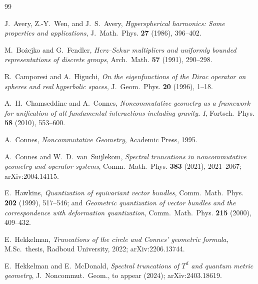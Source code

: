 \documentclass[11pt,a4paper]{article}
\theoremstyle{plain}
\theoremstyle{definition}
\begin{document}

\begin{thebibliography}{99}

J.~Avery, Z.-Y.~Wen, and J.~S.~Avery,
\newblock \emph{Hyperspherical harmonics: Some properties and applications},
\newblock J.~Math.~Phys. \textbf{27} (1986), 396--402.

M.~Bo{\.z}ejko and G.~Fendler,
\newblock \emph{Herz--Schur multipliers and uniformly bounded
representations of discrete groups},
\newblock Arch.~Math. \textbf{57} (1991), 290--298.

R.~Camporesi and A.~Higuchi,
\newblock \emph{On the eigenfunctions of the Dirac operator on
spheres and real hyperbolic spaces},
\newblock J.~Geom.~Phys. \textbf{20} (1996), 1--18.

A.~H.~Chamseddine and A.~Connes,
\newblock \emph{Noncommutative geometry as a framework for
unification of all fundamental interactions including gravity. I},
\newblock Fortsch.~Phys. \textbf{58} (2010), 553--600.

A.~Connes,
\newblock \emph{Noncommutative Geometry},
\newblock Academic Press, 1995.

A.~Connes and W.~D.~van~Suijlekom,
\newblock \emph{Spectral truncations in noncommutative geometry and
operator systems},
\newblock Comm.~Math.~Phys. \textbf{383} (2021), 2021--2067;
\newblock arXiv:2004.14115.

E.~Hawkins,
\newblock \emph{Quantization of equivariant vector bundles},
\newblock Comm.~Math.~Phys. \textbf{202} (1999), 517--546;
\newblock and \emph{Geometric quantization of vector bundles and the
correspondence with deformation quantization},
\newblock Comm.~Math.~Phys. \textbf{215} (2000), 409--432.

E.~Hekkelman,
\newblock \emph{Truncations of the circle and Connes' geometric
formula},
\newblock M.Sc.\ thesis, Radboud University, 2022;
\newblock arXiv:2206.13744.

E.~Hekkelman and E.~McDonald,
\newblock \emph{Spectral truncations of $T^d$ and quantum metric
geometry},
\newblock J.~Noncommut.~Geom., to appear (2024);
\newblock arXiv:2403.18619.


\end{thebibliography}
\end{document}
